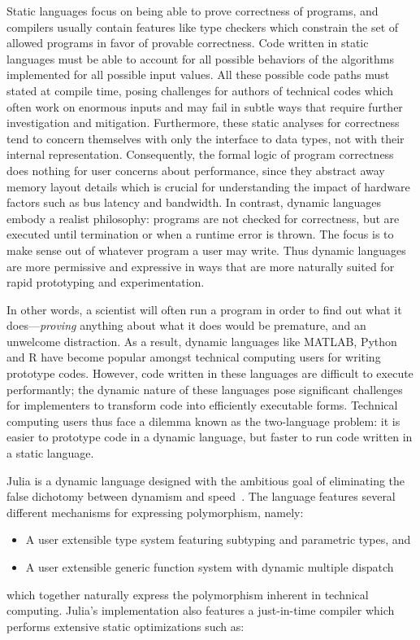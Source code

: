 \documentclass[pldi]{sigplanconf-pldi15}
\begin{document}
Static languages focus on being able to prove correctness of programs, and
compilers usually contain features like type checkers which constrain the set
of allowed programs in favor of provable correctness. Code written in static
languages must be able to account for all possible behaviors of the algorithms
implemented for all possible input values. All these possible code paths must
stated at compile time, posing challenges for authors of technical codes which
often work on enormous inputs and may fail in subtle ways that require further
investigation and mitigation. Furthermore, these static analyses for
correctness tend to concern themselves with only the interface to data types,
not with their internal representation. Consequently, the formal logic of
program correctness does nothing for user concerns about performance, since
they abstract away memory layout details which is crucial for understanding the
impact of hardware factors such as bus latency and bandwidth. In contrast,
dynamic languages embody a realist philosophy: programs are not checked for
correctness, but are executed until termination or when a runtime error is
thrown. The focus is to make sense out of whatever program a user may write.
Thus dynamic languages are more permissive and expressive in ways that are more
naturally suited for rapid prototyping and experimentation.

In other words, a scientist will often run a program in order to find out what
it does---\emph{proving} anything about what it does would be premature, and an
unwelcome distraction. As a result, dynamic languages like MATLAB, Python and R
have become popular amongst technical computing users for writing prototype
codes. However, code written in these languages are difficult to execute
performantly; the dynamic nature of these languages pose significant challenges
for implementers to transform code into efficiently executable forms. Technical
computing users thus face a dilemma known as the two-language problem: it is
easier to prototype code in a dynamic language, but faster to run code written
in a static language. 

Julia is a dynamic language designed with the ambitious goal of eliminating the
false dichotomy between dynamism and speed~\cite{Bezanson2012}. The language
features several different mechanisms for expressing polymorphism, namely:

\begin{itemize}
	\item A user extensible type system featuring subtyping and parametric
		types, and
	\item A user extensible generic function system with dynamic multiple
		dispatch
\end{itemize}
%
which together naturally express the polymorphism inherent in technical
computing. Julia's implementation also features a just-in-time compiler which
performs extensive static optimizations such as:
\end{document}
